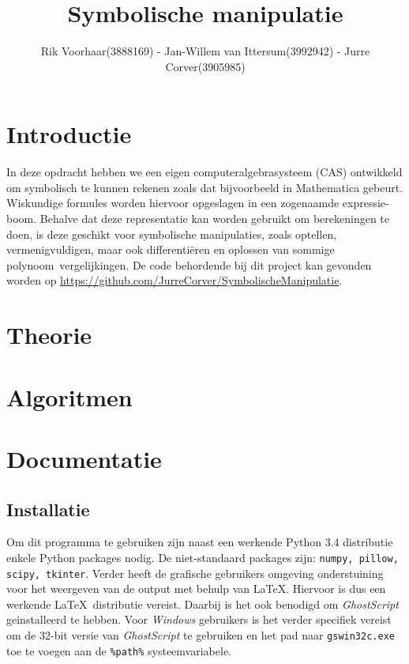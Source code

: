 \documentclass[a4paper]{article}
\title{Symbolische manipulatie}
\author{Rik Voorhaar(3888169) - Jan-Willem van Ittersum(3992942) - Jurre Corver(3905985)}
\begin{document}
\maketitle
\clearpage


\section{Introductie}
In deze opdracht hebben we een eigen computeralgebrasysteem (CAS) ontwikkeld om symbolisch te kunnen rekenen zoals dat bijvoorbeeld in Mathematica gebeurt. Wiskundige formules worden hiervoor opgeslagen in een zogenaamde expressie-boom. Behalve dat deze representatie kan worden gebruikt om berekeningen te doen, is deze geschikt voor symbolische manipulaties, zoals optellen, vermenigvuldigen, maar ook differenti\"eren en oplossen van sommige polynoom~vergelijkingen. De code behordende bij dit project kan gevonden worden op \url{https://github.com/JurreCorver/SymbolischeManipulatie}.


\section{Theorie}


\section{Algoritmen}



\section{Documentatie}
\subsection{Installatie}
Om dit programma te gebruiken zijn naast een werkende Python 3.4 distributie enkele Python packages nodig. De niet-standaard packages zijn: \texttt{numpy, pillow, scipy, tkinter}.
Verder heeft de grafische gebruikers omgeving onderstuining voor het weergeven van de output met behulp van \LaTeX. Hiervoor is dus een werkende \LaTeX~distributie vereist. Daarbij is het ook benodigd om \emph{GhostScript} geinstalleerd te hebben. Voor \emph{Windows} gebruikers is het verder specifiek vereist om de 32-bit versie van \emph{GhostScript} te gebruiken en het pad naar \texttt{gswin32c.exe} toe te voegen aan de \texttt{\%path\%} systeemvariabele.
\end{document}
